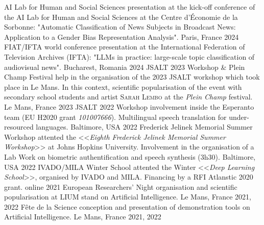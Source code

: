 \begin{absolutelynopagebreak}
\begin{cvhonors}
  \cvhonor
	{AI Lab for Human and Social Sciences}
    {presentation at the kick-off conference of the AI Lab for Human and Social Sciences at the Centre d'Économie de la Sorbonne: "Automatic Classification of News Subjects in Broadcast News: Application to a Gender Bias Representation Analysis".}
    {Paris, France}
    {2024}
  \cvhonor
    {FIAT/IFTA world conference}
    {presentation at the International Federation of Television Archives (IFTA): "LLMs in practice: large-scale topic classification of audiovisual news".}
    {Bucharest, Romania}
    {2024}
  \cvhonor
    {JSALT 2023 Workshop \& Plein Champ Festival}
    {help in the organisation of the 2023 JSALT workshop which took place in Le Mans. In this context, scientific popularisation of the event with secondary school students and artist \textsc{Sarah Lembo} at the \textit{Plein Champ} festival.}
    {Le Mans, France}
    {2023}
 \cvhonor
    {JSALT 2022 Workshop}
    {involvement inside the Esperanto team (EU H2020 grant \textit{101007666}). Multilingual speech translation for under-resourced languages.}
    {Baltimore, USA}
    {2022}
  \cvhonor
    {Frederick Jelinek Memorial Summer Workshop}
    {attented the <<\textit{Eighth Frederick Jelinek Memorial Summer Workshop}>> at Johns Hopkins University. Involvement in the organisation of a Lab Work on biometric authentification and speech synthesis (3h30).}
    {Baltimore, USA}
    {2022}
  \cvhonor
    {IVADO/MILA Winter School}
    {attented the Winter <<\textit{Deep Learning School}>>, organised by IVADO and MILA. Financing by a RFI Atlanstic 2020 grant.}
    {online}
    {2021}
\cvhonor
    {European Researchers' Night}
    {organisation and scientific popularisation at LIUM stand on Artificial Intelligence.}
    {Le Mans, France}
    {2021, 2022}
\cvhonor
    {Fête de la Science}
    {conception and presentation of demonstration tools on Artificial Intelligence.}
    {Le Mans, France}
    {2021, 2022}
\end{cvhonors}
\end{absolutelynopagebreak}
